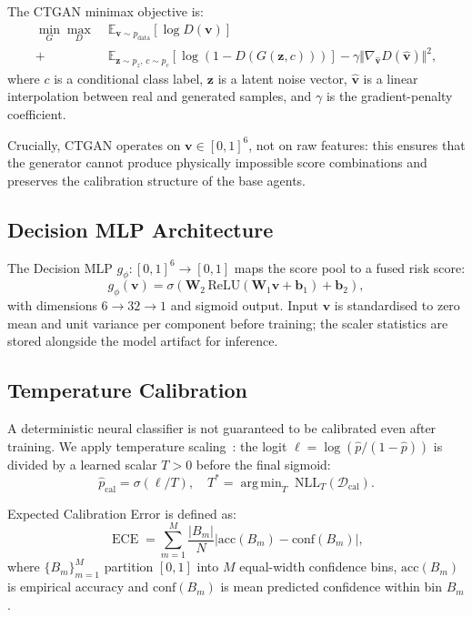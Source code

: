 \documentclass[journal]{IEEEtran}
\DeclareMathOperator*{\argmin}{arg\,min}
\DeclareMathOperator{\ECE}{ECE}
\newcommand{\E}{\mathbb{E}}
\begin{document}
The CTGAN minimax objective is:
\begin{align}\label{eq:ctgan}
  \min_G \max_D \;
  &\E_{\mathbf{v} \sim p_{\text{data}}}[\log D(\mathbf{v})] \nonumber\\
  +\; &\E_{\mathbf{z} \sim p_z,\, c \sim p_c}[\log(1-D(G(\mathbf{z},c)))]
  - \gamma \Vert \nabla_{\hat{\mathbf{v}}} D(\hat{\mathbf{v}}) \Vert^2,
\end{align}
where $c$ is a conditional class label, $\mathbf{z}$ is a latent noise vector,
$\hat{\mathbf{v}}$ is a linear interpolation between real and generated
samples, and $\gamma$ is the gradient-penalty coefficient.

Crucially, CTGAN operates on $\mathbf{v} \in [0,1]^6$, not on raw features:
this ensures that the generator cannot produce physically impossible score
combinations and preserves the calibration structure of the base agents.

\subsection{Decision MLP Architecture}

The Decision MLP $g_\phi : [0,1]^6 \to [0,1]$ maps the score pool to a
fused risk score:
\begin{equation}\label{eq:mlp}
  g_\phi(\mathbf{v}) = \sigma\!\left(
    \mathbf{W}_2 \,\text{ReLU}(\mathbf{W}_1 \mathbf{v} + \mathbf{b}_1)
    + \mathbf{b}_2
  \right),
\end{equation}
with dimensions $6 \to 32 \to 1$ and sigmoid output. Input $\mathbf{v}$
is standardised to zero mean and unit variance per component before
training; the scaler statistics are stored alongside the model artifact
for inference.

\subsection{Temperature Calibration}

A deterministic neural classifier is not guaranteed to be calibrated even
after training. We apply temperature scaling~\cite{guo2017calibration}: the
logit $\ell = \log(\hat{p}/(1-\hat{p}))$ is divided by a learned scalar
$T > 0$ before the final sigmoid:
\begin{equation}\label{eq:temperature}
  \hat{p}_{\text{cal}} = \sigma(\ell / T),
  \quad T^* = \argmin_T \; \mathrm{NLL}_T(\mathcal{D}_{\text{cal}}).
\end{equation}

Expected Calibration Error is defined as:
\begin{equation}\label{eq:ece}
  \ECE = \sum_{m=1}^{M} \frac{|B_m|}{N}
    \left| \text{acc}(B_m) - \text{conf}(B_m) \right|,
\end{equation}
where $\{B_m\}_{m=1}^M$ partition $[0,1]$ into $M$ equal-width confidence
bins, $\text{acc}(B_m)$ is empirical accuracy and $\text{conf}(B_m)$ is mean
predicted confidence within bin $B_m$.
\end{document}
